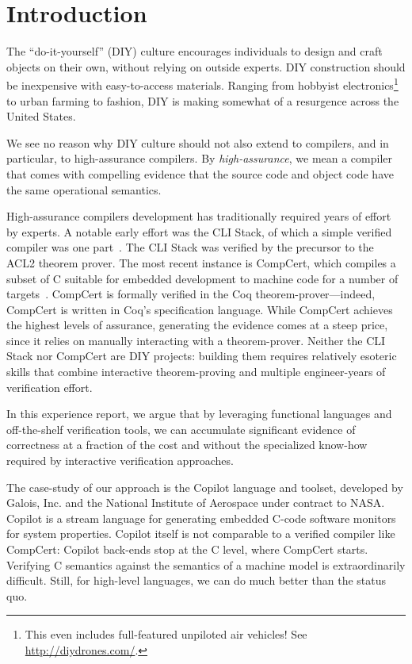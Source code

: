 \documentclass[9pt]{sigplanconf}
\begin{document}
\section{Introduction}\label{sec:intro}


The ``do-it-yourself'' (DIY) culture encourages individuals to design and craft
objects on their own, without relying on outside experts.  DIY construction
should be inexpensive with easy-to-access materials.  Ranging from hobbyist
electronics\footnote{This even includes full-featured unpiloted air vehicles!
  See \url{http://diydrones.com/}.} to urban farming to fashion, DIY is making
somewhat of a resurgence across the United States.

We see no reason why DIY culture should not also extend to compilers, and in
particular, to high-assurance compilers.  By \emph{high-assurance}, we mean a
compiler that comes with compelling evidence that the source code and object
code have the same operational semantics.

High-assurance compilers development has traditionally required years of effort
by experts.  A notable early effort was the CLI Stack, of which a simple
verified compiler was one part~\cite{cli}.  The CLI Stack was verified by the
precursor to the ACL2 theorem prover.  The most recent instance is CompCert,
which compiles a subset of C suitable for embedded development to machine code
for a number of targets~\cite{leroy}.  CompCert is formally verified in the Coq
theorem-prover---indeed, CompCert is written in Coq's specification language.
While CompCert achieves the highest levels of assurance, generating the evidence
comes at a steep price, since it relies on manually interacting with a
theorem-prover.  Neither the CLI Stack nor CompCert are DIY projects:
building them requires relatively esoteric skills that combine interactive
theorem-proving and multiple engineer-years of verification effort.

In this experience report, we argue that by leveraging functional languages and
off-the-shelf verification tools, we can accumulate significant evidence of
correctness at a fraction of the cost and without the specialized know-how
required by interactive verification approaches.  

The case-study of our approach is the Copilot language and toolset, developed by
Galois, Inc. and the National Institute of Aerospace under contract to NASA.
Copilot is a stream language for generating embedded C-code software monitors
for system properties.  Copilot itself is not comparable to a verified compiler
like CompCert: Copilot back-ends stop at the C level, where CompCert starts.
Verifying C semantics against the semantics of a machine model is
extraordinarily difficult.  Still, for high-level languages, we can do much
better than the status quo.
\end{document}
